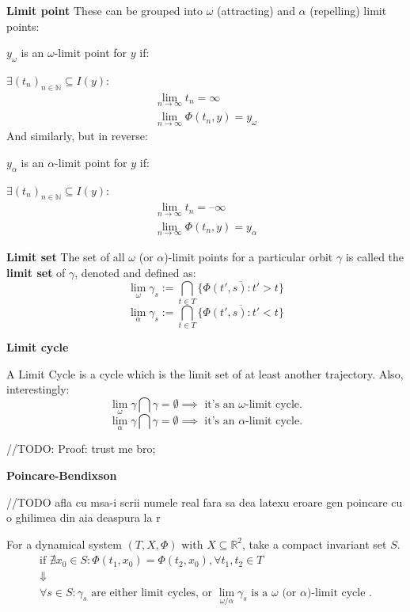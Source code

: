 \begin{definition}\textbf{Limit point}
  These can be grouped into $\omega$ (attracting) and $\alpha$ (repelling) limit points:

  $y_\omega$ is an $\omega$-limit point  for $y$ if:

  $\exists (t_n)_{n \in \mathbb{N}} \subseteq I(y) : $
  \begin{gather*}
    \lim_{n \rightarrow \infty} t_n = \infty  \\
    \lim_{n \rightarrow \infty} \Phi(t_n,y) = y_\omega
  \end{gather*}
  And similarly, but in reverse:

  $y_\alpha$ is an $\alpha$-limit point  for $y$ if:

  $\exists (t_n)_{n \in \mathbb{N}} \subseteq I(y) : $
  \begin{gather*}
    \lim_{n \rightarrow \infty} t_n = \textbf{--} \infty  \\
    \lim_{n \rightarrow \infty} \Phi(t_n,y) = y_\alpha
  \end{gather*}
\end{definition}

\begin{definition}\textbf{Limit set}
  The set of all $\omega$ (or $\alpha$)-limit points for a particular orbit $\gamma$ is called the \textbf{limit set} of $\gamma$, denoted and defined as:
  \[
    \lim_{\omega}\gamma_s := \bigcap_{t \in T} \overline{ \{ \Phi(t', s) : t' > t \} }
  \]
  \[
    \lim_{\alpha}\gamma_s := \bigcap_{t \in T} \overline{ \{ \Phi(t', s) : t' < t \} }
  \]
\end{definition}

\begin{definition} \textbf{Limit cycle}

  A Limit Cycle is a cycle which is the limit set of at least another trajectory.
  Also, interestingly:
  \[
    \lim_{\omega}\gamma \bigcap \gamma  = \emptyset \implies \text{ it's an } \omega \text{-limit cycle}.
  \]
  \[
    \lim_{\alpha}\gamma \bigcap \gamma  = \emptyset \implies \text{ it's an } \alpha \text{-limit cycle}.
  \]
\end{definition}

//TODO: Proof: trust me bro;
\begin{theorem}  \textbf{Poincare-Bendixson}

  //TODO afla cu msa-i scrii numele real fara sa dea latexu eroare gen poincare cu o ghilimea din aia deaspura la r

  For a dynamical system $(T,X,\Phi)$ with $X \subseteq \mathbb{R}^2$, take a compact invariant set $S$.
  \begin{gather*}
    \text{if } \nexists x_0 \in S : \Phi(t_1, x_0) = \Phi(t_2,x_0), \forall t_1,t_2 \in T \\
    \Downarrow \\
    \forall s \in S: \gamma_s \text{ are either limit cycles, or } \lim_{\omega / \alpha}\gamma_s \text{ is a $\omega$ (or $\alpha$)-limit cycle }.
  \end{gather*}
\end{theorem}

